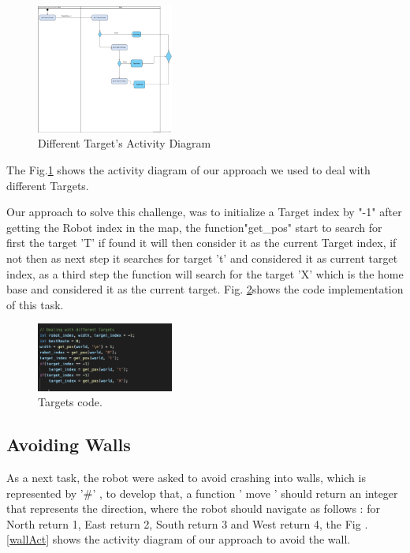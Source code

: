 \documentclass[conference]{IEEEtran}
\begin{document}
\begin{figure}[!h]
	
	\centering
	\includegraphics[width=0.4\textwidth]{targets.png}
	\caption{\label{targetAct}Different Target's Activity Diagram }
	
\end{figure}

The Fig.\ref{targetAct}   shows the activity diagram of our  approach we used to deal with different Targets.


Our approach to solve this challenge, was to initialize a Target index by "-1" after getting the Robot index in the map, the function"get\_pos" start to search for first the target 'T' if found it will then consider it as the current Target index, if  not then as next step it searches for target 't' and considered it as current target index, as a third step the function will search for the target 'X' which is the home base and considered it as the current target. Fig. \ref{targetCode}shows  the code implementation of this task. 

\begin{figure}[!h]
	
	\centering
	\includegraphics[width=0.4\textwidth]{targetsCode.png}
	\caption{\label{targetCode}Targets code.}
	
\end{figure}

\subsection{Avoiding Walls }

As a next task, the robot were asked to avoid crashing into walls, which is represented by '\#' , to develop that, a function ' move ' should return  an integer that represents the direction, where the robot should navigate as follows : for  North return 1,  East return 2,  South return  3
and West return  4, the Fig .\ref{wallAct} shows the activity diagram of our approach to avoid the wall.
\end{document}

